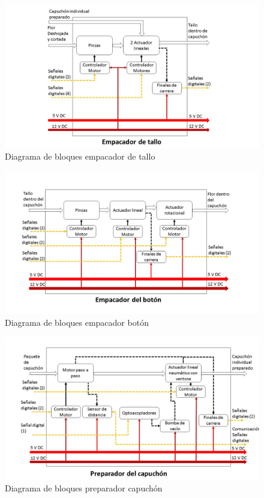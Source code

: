 \begin{figure}[htb]
	\centering
	\includegraphics[scale=0.4]{Figuras/PreparadorTallo}
	\caption{Diagrama de bloques empacador de tallo}
	\label{fig:DBAlimentacion}
\end{figure}
\begin{figure}[H]
	\centering
	\includegraphics[scale=0.4]{Figuras/EmpacadorBoton}
	\caption{Diagrama de bloques empacador botón}
	\label{fig:DBAlimentacion}
\end{figure}
\begin{figure}[H]
	\centering
	\includegraphics[scale=0.5]{Figuras/PreparadorCapuchon}
	\caption{Diagrama de bloques preparador capuchón}
	\label{fig:DBAlimentacion}
\end{figure}


